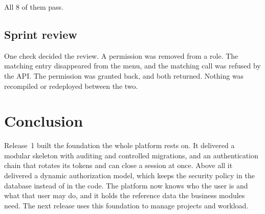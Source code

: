 All 8 of them pass.

\subsection{Sprint review}
One check decided the review. A permission was removed from a role. The matching entry disappeared
from the menu, and the matching call was refused by the API. The permission was granted back, and
both returned. Nothing was recompiled or redeployed between the two.

\section*{Conclusion}
Release~1 built the foundation the whole platform rests on. It delivered a modular skeleton with
auditing and controlled migrations, and an authentication chain that rotates its tokens and can
close a session at once. Above all it delivered a dynamic authorization model, which keeps the
security policy in the database instead of in the code. The platform now knows who the user is and
what that user may do, and it holds the reference data the business modules need. The next release
uses this foundation to manage projects and workload.
